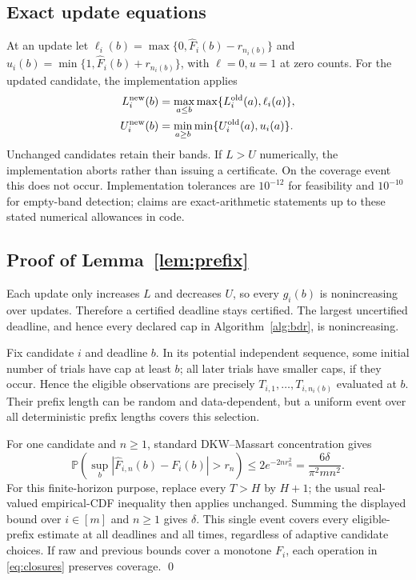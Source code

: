 \documentclass[11pt]{article}
\theoremstyle{definition}\newtheorem{definition}[theorem]{Definition}
\newcommand{\Pp}{\mathbb{P}}
\begin{document}
\subsection{Exact update equations}
At an update let $\ell_i(b)=\max\{0,\widehat F_i(b)-r_{n_i(b)}\}$ and $u_i(b)=\min\{1,\widehat F_i(b)+r_{n_i(b)}\}$, with $\ell=0,u=1$ at zero counts. For the updated candidate, the implementation applies
\begin{align}\label{eq:closures}
 L_i^{\rm new}(b)&=\max_{a\le b}\max\{L_i^{\rm old}(a),\ell_i(a)\},\\
 U_i^{\rm new}(b)&=\min_{a\ge b}\min\{U_i^{\rm old}(a),u_i(a)\}.
\end{align}
Unchanged candidates retain their bands. If $L>U$ numerically, the implementation aborts rather than issuing a certificate. On the coverage event this does not occur. Implementation tolerances are $10^{-12}$ for feasibility and $10^{-10}$ for empty-band detection; claims are exact-arithmetic statements up to these stated numerical allowances in code.

\subsection{Proof of Lemma~\ref{lem:prefix}}
Each update only increases $L$ and decreases $U$, so every $g_i(b)$ is nonincreasing over updates. Therefore a certified deadline stays certified. The largest uncertified deadline, and hence every declared cap in Algorithm~\ref{alg:bdr}, is nonincreasing.

Fix candidate $i$ and deadline $b$. In its potential independent sequence, some initial number of trials have cap at least $b$; all later trials have smaller caps, if they occur. Hence the eligible observations are precisely $T_{i,1},\ldots,T_{i,n_i(b)}$ evaluated at $b$. Their prefix length can be random and data-dependent, but a uniform event over all deterministic prefix lengths covers this selection.

For one candidate and $n\ge1$, standard DKW--Massart concentration gives
\[
 \Pp\left(\sup_b|\widehat F_{i,n}(b)-F_i(b)|>r_n\right)
 \le2e^{-2nr_n^2}=\frac{6\delta}{\pi^2mn^2}.
\]
For this finite-horizon purpose, replace every $T>H$ by $H+1$; the usual real-valued empirical-CDF inequality then applies unchanged. Summing the displayed bound over $i\in[m]$ and $n\ge1$ gives $\delta$. This single event covers every eligible-prefix estimate at all deadlines and all times, regardless of adaptive candidate choices. If raw and previous bounds cover a monotone $F_i$, each operation in \eqref{eq:closures} preserves coverage. \qed
\end{document}

